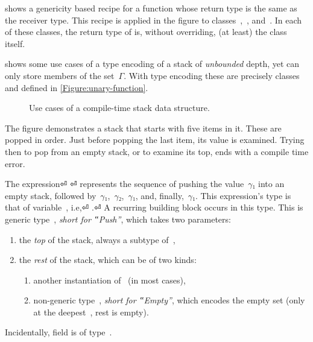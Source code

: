  shows a genericity based recipe for
  a function whose return type
  is the same as the receiver type.
  This recipe is applied in the figure to classes~,~, and~.
  In each of these classes, the return type of  is,
  without overriding, (at least) the class itself.

 shows some use cases of a type encoding of
  a stack of \emph{unbounded} depth, yet can only store members of the set~$Γ$.
With type encoding these are precisely classes~
  and  defined in \cref{Figure:unary-function}.

\begin{figure}[!htp]
  \caption{\label{Figure:stack-use-cases}%
    Use cases of a compile-time stack data structure.
  }
\end{figure}

The figure demonstrates a stack that starts with five items in it.
These are popped in order. Just before popping the last item, its
  value is examined.
Trying then to pop from an empty stack, or to examine its top, ends with
  a compile time error.

The expression⏎
  \mbox{\qquad\qquad} ⏎
represents the sequence of pushing the value~$γ₁$ into an
empty stack, followed by~$γ₁$,~$γ₂$,~$γ₁$, and, finally,~$γ₁$.
This expression's type is that of variable~, i.e,⏎
\mbox{\qquad\qquad} .⏎
A recurring building block occurs in this type.
This is generic type~, \emph{short for ‟Push”}, which takes two parameters:
  \begin{enumerate}
    \item the \emph{top} of the stack, always a subtype of~,
    \item the \emph{rest} of the stack, which can be of two kinds:
          \begin{enumerate}
            \item another instantiation of~ (in most cases),
            \item non-generic type~, \emph{short for ‟Empty”}, which encodes the empty
                  set (only at the deepest~, rest is empty).
          \end{enumerate}
  \end{enumerate}
Incidentally,  field  is of type~.

